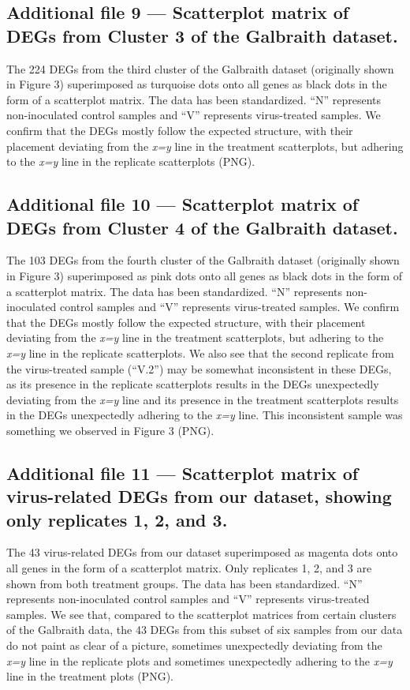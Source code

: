 \documentclass{bmcart}
\begin{document}
\begin{linenumbers}
\begin{backmatter}
  \subsection*{Additional file 9 --- Scatterplot matrix of DEGs from Cluster 3 of the Galbraith dataset.}
    The 224 DEGs from the third cluster of the Galbraith dataset (originally shown in Figure 3) superimposed as turquoise dots onto all genes as black dots in the form of a scatterplot matrix. The data has been standardized. ``N'' represents non-inoculated control samples and ``V'' represents virus-treated samples. We confirm that the DEGs mostly follow the expected structure, with their placement deviating from the \textit{x=y} line in the treatment scatterplots, but adhering to the \textit{x=y} line in the replicate scatterplots (PNG).
    
  \subsection*{Additional file 10 --- Scatterplot matrix of DEGs from Cluster 4 of the Galbraith dataset.} 
    The 103 DEGs from the fourth cluster of the Galbraith dataset (originally shown in Figure 3) superimposed as pink dots onto all genes as black dots in the form of a scatterplot matrix. The data has been standardized. ``N'' represents non-inoculated control samples and ``V'' represents virus-treated samples. We confirm that the DEGs mostly follow the expected structure, with their placement deviating from the \textit{x=y} line in the treatment scatterplots, but adhering to the \textit{x=y} line in the replicate scatterplots. We also see that the second replicate from the virus-treated sample (``V.2'') may be somewhat inconsistent in these DEGs, as its presence in the replicate scatterplots results in the DEGs unexpectedly deviating from the \textit{x=y} line and its presence in the treatment scatterplots results in the DEGs unexpectedly adhering to the \textit{x=y} line. This inconsistent sample was something we observed in Figure 3 (PNG).
    
  \subsection*{Additional file 11 --- Scatterplot matrix of virus-related DEGs from our dataset, showing only replicates 1, 2, and 3.} 
    The 43 virus-related DEGs from our dataset superimposed as magenta dots onto all genes in the form of a scatterplot matrix. Only replicates 1, 2, and 3 are shown from both treatment groups. The data has been standardized. ``N'' represents non-inoculated control samples and ``V'' represents virus-treated samples. We see that, compared to the scatterplot matrices from certain clusters of the Galbraith data, the 43 DEGs from this subset of six samples from our data do not paint as clear of a picture, sometimes unexpectedly deviating from the \textit{x=y} line in the replicate plots and sometimes unexpectedly adhering to the \textit{x=y} line in the treatment plots (PNG).
    

\end{backmatter}
\end{linenumbers}
\end{document}
